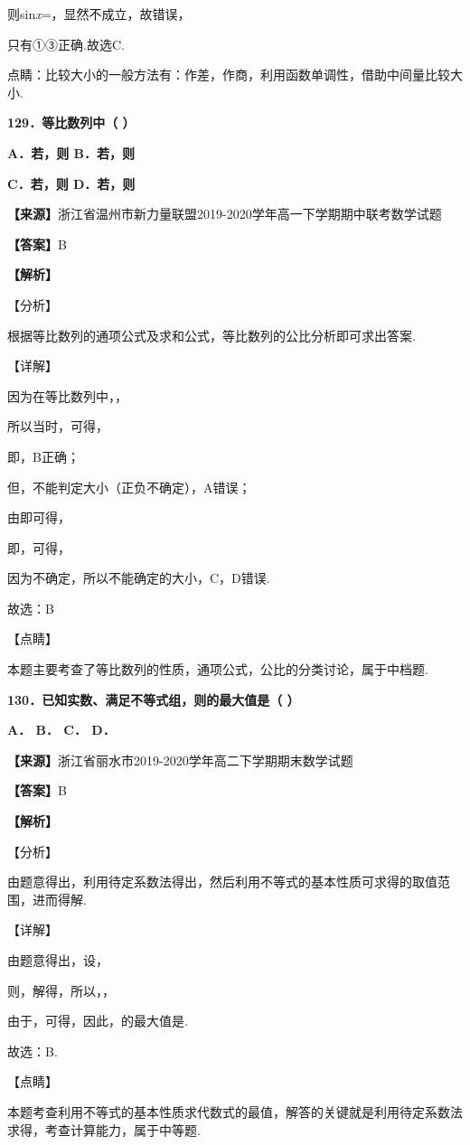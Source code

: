 则sin\emph{x}=，显然不成立，故错误，

只有①③正确.故选C.

点睛：比较大小的一般方法有：作差，作商，利用函数单调性，借助中间量比较大小.

\textbf{129．等比数列中（ ）}

\textbf{A．若，则 B．若，则}

\textbf{C．若，则 D．若，则}

\textbf{【来源】}浙江省温州市新力量联盟2019-2020学年高一下学期期中联考数学试题

\textbf{【答案】}B

\textbf{【解析】}

【分析】

根据等比数列的通项公式及求和公式，等比数列的公比分析即可求出答案.

【详解】

因为在等比数列中，，

所以当时，可得，

即，B正确；

但，不能判定大小（正负不确定），A错误；

由即可得，

即，可得，

因为不确定，所以不能确定的大小，C，D错误.

故选：B

【点睛】

本题主要考查了等比数列的性质，通项公式，公比的分类讨论，属于中档题.

\textbf{130．已知实数、满足不等式组，则的最大值是（ ）}

\textbf{A． B． C． D．}

\textbf{【来源】}浙江省丽水市2019-2020学年高二下学期期末数学试题

\textbf{【答案】}B

\textbf{【解析】}

【分析】

由题意得出，利用待定系数法得出，然后利用不等式的基本性质可求得的取值范围，进而得解.

【详解】

由题意得出，设，

则，解得，所以，，

由于，可得，因此，的最大值是.

故选：B.

【点睛】

本题考查利用不等式的基本性质求代数式的最值，解答的关键就是利用待定系数法求得，考查计算能力，属于中等题.

